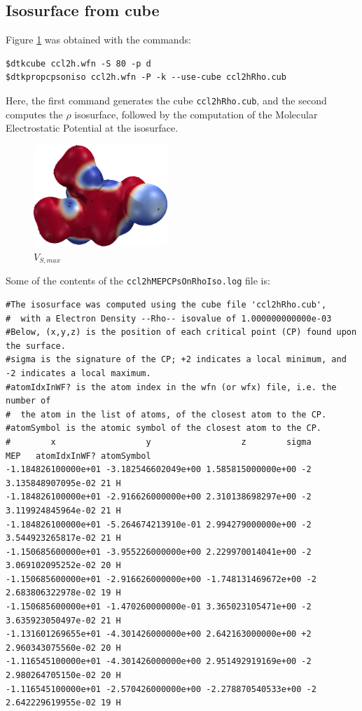 \subsection{Isosurface from cube}
Figure \ref{fig:vsmaxiso} was obtained with the commands:
\begin{lstlisting}
$dtkcube ccl2h.wfn -S 80 -p d
$dtkpropcpsoniso ccl2h.wfn -P -k --use-cube ccl2hRho.cub
\end{lstlisting}
Here, the first command generates the cube \texttt{ccl2hRho.cub}, and
the second computes the $\rho$ isosurface, followed by the computation
of the Molecular Electrostatic Potential at the isosurface.
%
\begin{figure}[ht!]
\centering
\includegraphics[width=0.45\textwidth]{ccl2hMEPCPsOnRhoIso}
\caption{$V_{S,max}$}\label{fig:vsmaxiso}
\end{figure}
%

Some of the contents of the \texttt{ccl2hMEPCPsOnRhoIso.log} file is:
\begin{scriptsize}
\begin{verbatim}
#The isosurface was computed using the cube file 'ccl2hRho.cub',
#  with a Electron Density --Rho-- isovalue of 1.000000000000e-03
#Below, (x,y,z) is the position of each critical point (CP) found upon the surface.
#sigma is the signature of the CP; +2 indicates a local minimum, and -2 indicates a local maximum.
#atomIdxInWF? is the atom index in the wfn (or wfx) file, i.e. the number of
#  the atom in the list of atoms, of the closest atom to the CP.
#atomSymbol is the atomic symbol of the closest atom to the CP.
#        x                  y                  z        sigma       MEP   atomIdxInWF? atomSymbol
-1.184826100000e+01 -3.182546602049e+00 1.585815000000e+00 -2 3.135848907095e-02 21 H
-1.184826100000e+01 -2.916626000000e+00 2.310138698297e+00 -2 3.119924845964e-02 21 H
-1.184826100000e+01 -5.264674213910e-01 2.994279000000e+00 -2 3.544923265817e-02 21 H
-1.150685600000e+01 -3.955226000000e+00 2.229970014041e+00 -2 3.069102095252e-02 20 H
-1.150685600000e+01 -2.916626000000e+00 -1.748131469672e+00 -2 2.683806322978e-02 19 H
-1.150685600000e+01 -1.470260000000e-01 3.365023105471e+00 -2 3.635923050497e-02 21 H
-1.131601269655e+01 -4.301426000000e+00 2.642163000000e+00 +2 2.960343075560e-02 20 H
-1.116545100000e+01 -4.301426000000e+00 2.951492919169e+00 -2 2.980264705150e-02 20 H
-1.116545100000e+01 -2.570426000000e+00 -2.278870540533e+00 -2 2.642229619955e-02 19 H
\end{verbatim}
\end{scriptsize}


